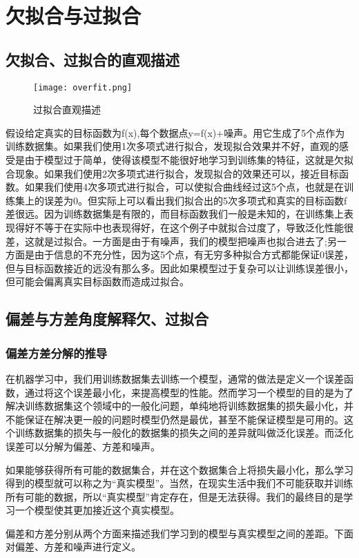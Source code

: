 \documentclass[forprint]{report}
\begin{document}
\chapter{欠拟合与过拟合}
\section{欠拟合、过拟合的直观描述}
\begin{figure}[ht]
	\centering
	\texttt{[image: overfit.png]}
	\caption{过拟合直观描述}
	\label{fig:1}
\end{figure}
假设给定真实的目标函数为f(x),每个数据点y=f(x)+噪声。用它生成了5个点作为训练数据集。如果我们使用1次多项式进行拟合，发现拟合效果并不好，直观的感受是由于模型过于简单，使得该模型不能很好地学习到训练集的特征，这就是欠拟合现象。如果我们使用2次多项式进行拟合，发现拟合的效果还可以，接近目标函数。如果我们使用4次多项式进行拟合，可以使拟合曲线经过这5个点，也就是在训练集上的误差为0。但实际上可以看出我们拟合出的5次多项式和真实的目标函数f差很远。因为训练数据集是有限的，而目标函数我们一般是未知的，在训练集上表现得好不等于在实际中也表现得好，在这个例子中就拟合过度了，导致泛化性能很差，这就是过拟合。一方面是由于有噪声，我们的模型把噪声也拟合进去了;另一方面是由于信息的不充分性，因为这5个点，有无穷多种拟合方式都能保证0误差，但与目标函数接近的远没有那么多。因此如果模型过于复杂可以让训练误差很小，但可能会偏离真实目标函数而造成过拟合。
\section{偏差与方差角度解释欠、过拟合}
\subsection{偏差方差分解的推导}
在机器学习中，我们用训练数据集去训练一个模型，通常的做法是定义一个误差函数，通过将这个误差最小化，来提高模型的性能。然而学习一个模型的目的是为了解决训练数据集这个领域中的一般化问题，单纯地将训练数据集的损失最小化，并不能保证在解决更一般的问题时模型仍然是最优，甚至不能保证模型是可用的。这个训练数据集的损失与一般化的数据集的损失之间的差异就叫做泛化误差。而泛化误差可以分解为偏差、方差和噪声。

如果能够获得所有可能的数据集合，并在这个数据集合上将损失最小化，那么学习得到的模型就可以称之为“真实模型”。当然，在现实生活中我们不可能获取并训练所有可能的数据，所以“真实模型”肯定存在，但是无法获得。我们的最终目的是学习一个模型使其更加接近这个真实模型。

偏差和方差分别从两个方面来描述我们学习到的模型与真实模型之间的差距。下面对偏差、方差和噪声进行定义。
\end{document}
